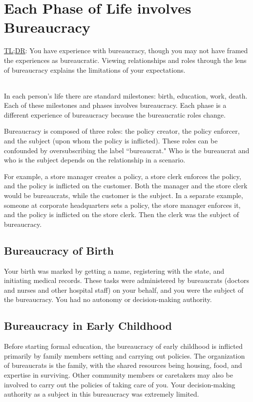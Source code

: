 \section{Each Phase of Life involves Bureaucracy}

\href{https://en.wikipedia.org/wiki/TL;DR}{TL;DR}: 
You have experience with bureaucracy, though you may not have framed the experiences as bureaucratic. Viewing relationships and roles through the lens of bureaucracy explains the limitations of your expectations.

\ \\

In each person's life there are standard milestones: birth, education, work, death. 
Each of these milestones and phases involves bureaucracy. Each phase is a different experience of bureaucracy because the bureaucratic roles change.

Bureaucracy is composed of three roles: the policy creator, the policy enforcer, and the subject (upon whom the policy is inflicted). 
These roles can be confounded by oversubscribing the label ``bureaucrat." Who is the bureaucrat and who is the subject depends on the relationship in a scenario. 

For example, a store manager creates a policy, a store clerk enforces the policy, 
and the policy is inflicted on the customer. Both the manager and the store clerk would be bureaucrats, while the customer is the subject. In a separate example, someone at corporate headquarters sets a policy, the store manager enforces it, and the policy is inflicted on the store clerk. Then the clerk was the subject of bureaucracy. 


\subsection*{Bureaucracy of Birth\label{sec:bureacracy-of-birth}}
Your birth was marked by getting a name, registering with the state, and initiating medical records. These tasks were administered by bureaucrats (doctors and nurses and other hospital staff) on your behalf, and you were the subject of the bureaucracy. You had no autonomy or decision-making authority. 

\subsection*{Bureaucracy in Early Childhood\label{sec:bureaucracy-early-childhood}}
Before starting formal education, the bureaucracy of early childhood is inflicted primarily by family members setting and carrying out policies. The organization of bureaucrats is the family, with the shared resources being housing, food, and expertise in surviving. Other community members or caretakers may also be involved to carry out the policies of taking care of you. Your decision-making authority as a subject in this bureaucracy was extremely limited. 

